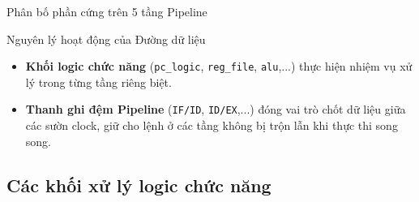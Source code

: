 \begin{frame}{Phân bố phần cứng trên 5 tầng Pipeline}
    
    \vspace{0.3cm}
    \begin{block}{Nguyên lý hoạt động của Đường dữ liệu}
        \scriptsize
        \begin{itemize}
            \item \textbf{Khối logic chức năng} (\texttt{pc\_logic}, \texttt{reg\_file}, \texttt{alu},...) thực hiện nhiệm vụ xử lý trong từng tầng riêng biệt.
            \item \textbf{Thanh ghi đệm Pipeline} (\texttt{IF/ID}, \texttt{ID/EX},...) đóng vai trò chốt dữ liệu giữa các sườn clock, giữ cho lệnh ở các tầng không bị trộn lẫn khi thực thi song song.
        \end{itemize}
    \end{block}
\end{frame}

\subsection{Các khối xử lý logic chức năng}
